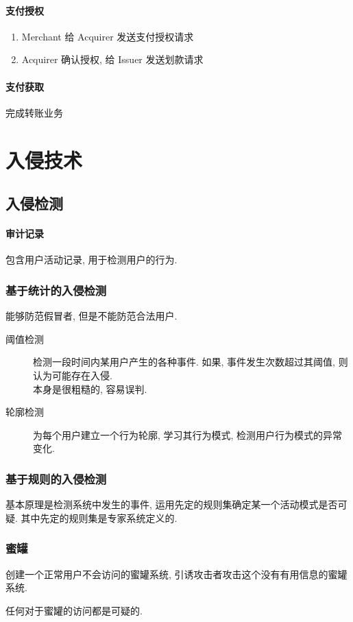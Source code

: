 \documentclass{ctexart}
\begin{document}
\clearpage
\paragraph{支付授权}
    \begin{enumerate}
        \item Merchant 给 Acquirer 发送支付授权请求
        \item Acquirer 确认授权, 给 Issuer 发送划款请求
    \end{enumerate}
\paragraph{支付获取}
    完成转账业务

\section{入侵技术}
\subsection{入侵检测}
\paragraph{审计记录} 包含用户活动记录, 用于检测用户的行为.
\subsubsection{基于统计的入侵检测}
    能够防范假冒者, 但是不能防范合法用户.\par
    \begin{description}
        \item[阈值检测] 检测一段时间内某用户产生的各种事件.
            如果, 事件发生次数超过其阈值, 则认为可能存在入侵.\\
            本身是很粗糙的, 容易误判.
        \item[轮廓检测] 为每个用户建立一个行为轮廓, 学习其行为模式,
            检测用户行为模式的异常变化.
    \end{description}
\subsubsection{基于规则的入侵检测}
    基本原理是检测系统中发生的事件,
    运用先定的规则集确定某一个活动模式是否可疑.
    其中先定的规则集是专家系统定义的.
\subsubsection{蜜罐}
    创建一个正常用户不会访问的蜜罐系统,
    引诱攻击者攻击这个没有有用信息的蜜罐系统.\par
    任何对于蜜罐的访问都是可疑的.
\end{document}
